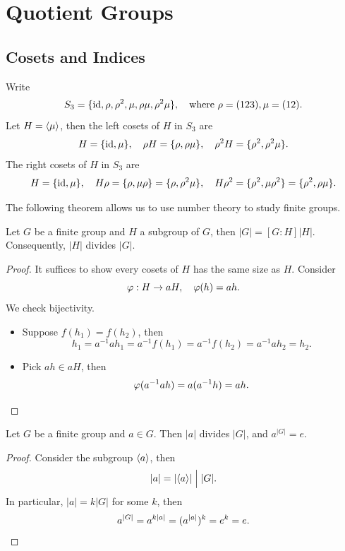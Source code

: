 \chapter{Quotient Groups}

\section{Cosets and Indices}

\begin{example}
  Write \[
    S_3 = \{\operatorname{id}, \rho, \rho^2, \mu, \rho\mu, \rho^2\mu\},
    \quad\text{where } \rho = (123), \mu = (12).
  \]
  Let \(H = \langle\mu\rangle\), then the left cosets of \(H\) in \(S_3\) are \[
    H = \{\operatorname{id}, \mu\}, \quad
    \rho H = \{\rho, \rho\mu\}, \quad
    \rho^2 H = \{\rho^2, \rho^2\mu\}.
  \]
  The right cosets of \(H\) in \(S_3\) are \[
    H = \{\operatorname{id}, \mu\}, \quad
    H\rho = \{\rho, \mu\rho\} = \{\rho, \rho^2\mu\}, \quad
    H\rho^2 = \{\rho^2, \mu\rho^2\} = \{\rho^2, \rho\mu\}.
  \]
\end{example}

The following theorem allows us to use number theory to study finite groups.

\begin{theorem}[Lagrange]
  Let \(G\) be a finite group and \(H\) a subgroup of \(G\), then \(|G| = [G:H]|H|\). Consequently, \(|H|\) divides \(|G|\).
\end{theorem}
\begin{proof}
  It suffices to show every cosets of \(H\) has the same size as \(H\). Consider \[
    \varphi:H\to aH, \quad
    \varphi(h) = ah.
  \]
  We check bijectivity.
  \begin{itemize}
    \item Suppose \(f(h_1) = f(h_2)\), then \[
      h_1 = a^{-1}ah_1 = a^{-1}f(h_1) = a^{-1}f(h_2) = a^{-1}ah_2 = h_2.
    \]
    \item Pick \(ah\in aH\), then\[
      \varphi(a^{-1}ah) = a(a^{-1}h) = ah. \qedhere
    \]
  \end{itemize}
\end{proof}

\begin{corollary}
  Let \(G\) be a finite group and \(a\in G\). Then \(|a|\) divides \(|G|\), and \(a^{|G|} = e\).
\end{corollary}
\begin{proof}
  Consider the subgroup \(\langle a\rangle\), then \[
    |a| = |\langle a\rangle| \Bigm| |G|.
  \]
  In particular, \(|a| = k|G|\) for some \(k\), then \[
    a^{|G|} = a^{k|a|} = (a^{|a|})^k = e^k = e. \qedhere
  \]
\end{proof}


